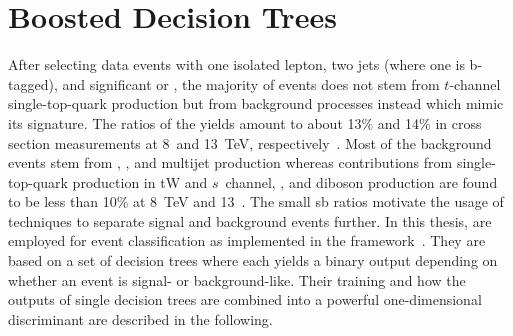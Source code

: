 

\section{Boosted Decision Trees}

After selecting data events with one isolated lepton, two jets (where one is b-tagged), and significant \met or \mtw, the majority of events does not stem from $t$-channel single-top-quark production but from background processes instead which mimic its signature. The ratios of the  yields amount to about 13\% and 14\% in cross section measurements at 8~and 13~TeV, respectively~\cite{Khachatryan:2014iya,Sirunyan:2016cdg}.  Most of the background events stem from \wjets, \ttbar, and multijet production whereas contributions from single-top-quark production in tW and $s$~channel, \zjets, and diboson production are found to be less than 10\% at 8~TeV and 13~\TeV. The small \gls{sb} ratios motivate the usage of  techniques to separate signal and background events further. In this thesis,  are employed for event classification as implemented in the \TMVA[format=hyperbf] framework~\cite{Hocker:2007ht}. They are based on a set of decision trees where each yields a binary output depending on whether an event is signal- or background-like. Their training and how the outputs of single decision trees are combined into a powerful one-dimensional discriminant are described in the following.

